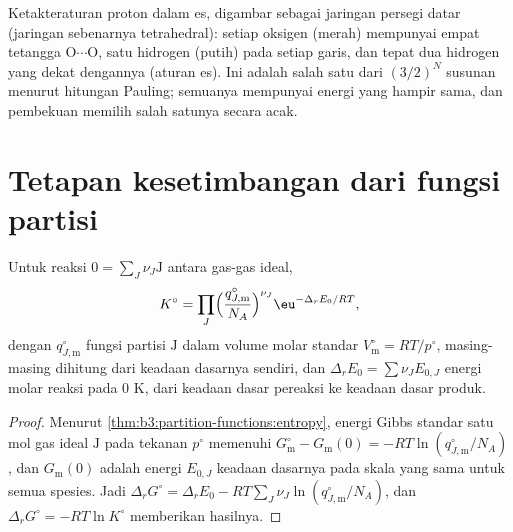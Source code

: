 \begin{omfigure}

{\small Ketakteraturan proton dalam es, digambar sebagai jaringan persegi datar
(jaringan sebenarnya tetrahedral): setiap oksigen (merah) mempunyai empat
tetangga O$\cdots$O, satu hidrogen (putih) pada setiap garis, dan tepat dua
hidrogen yang dekat dengannya (aturan es). Ini adalah salah satu dari
$(3/2)^N$ susunan menurut hitungan Pauling; semuanya mempunyai energi yang hampir
sama, dan pembekuan memilih salah satunya secara acak.}
\end{omfigure}

\section{Tetapan kesetimbangan dari fungsi partisi}

\begin{theorem}\label{thm:b3:statistical-thermo-applied:k-from-q}
Untuk reaksi $0 = \sum_J\nu_J\mathrm J$ antara gas-gas ideal,
\[
  K^\circ = \prod_J\Bigl(\frac{q^\circ_{J,\mathrm m}}{N_A}\Bigr)^{\nu_J}\eu^{-\Delta_rE_0/RT},
\]
dengan $q^\circ_{J,\mathrm m}$ fungsi partisi $\mathrm J$ dalam volume molar standar
$V^\circ_{\mathrm m} = RT/p^\circ$, masing-masing dihitung dari keadaan dasarnya
sendiri, dan $\Delta_rE_0 =
\sum\nu_JE_{0,J}$ energi molar reaksi pada 0 K, dari keadaan dasar pereaksi ke
keadaan dasar produk.
\end{theorem}

\begin{proof}
Menurut \cref{thm:b3:partition-functions:entropy}, energi Gibbs standar satu mol gas ideal $\mathrm J$
pada tekanan $p^\circ$ memenuhi
$G^\circ_{\mathrm m} - G_{\mathrm m}(0) = -RT\ln(q^\circ_{J,\mathrm m}/N_A)$, dan $G_{\mathrm m}(0)$
adalah energi $E_{0,J}$ keadaan dasarnya pada skala yang sama untuk semua
spesies. Jadi $\Delta_rG^\circ =
\Delta_rE_0 - RT\sum_J\nu_J\ln(q^\circ_{J,\mathrm m}/N_A)$, dan $\Delta_rG^\circ = -RT\ln K^\circ$
memberikan hasilnya.
\end{proof}

